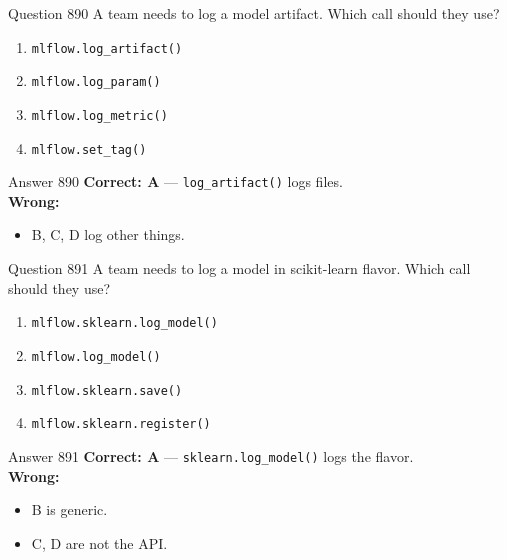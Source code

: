 \documentclass[aspectratio=169,11pt]{beamer}
\begin{document}
	\begin{frame}{Question 890}
		A team needs to log a model artifact. Which call should they use?
		\begin{enumerate}[label=\Alph*.]
			\item \texttt{mlflow.log\_artifact()}
			\item \texttt{mlflow.log\_param()}
			\item \texttt{mlflow.log\_metric()}
			\item \texttt{mlflow.set\_tag()}
		\end{enumerate}
	\end{frame}
	\begin{frame}{Answer 890}
		\textbf{Correct: A} --- \texttt{log\_artifact()} logs files.\\
		\vspace{0.5em}
		\textbf{Wrong:}
		\begin{itemize}
			\item B, C, D log other things.
		\end{itemize}
	\end{frame}
	
	\begin{frame}{Question 891}
		A team needs to log a model in scikit-learn flavor. Which call should they use?
		\begin{enumerate}[label=\Alph*.]
			\item \texttt{mlflow.sklearn.log\_model()}
			\item \texttt{mlflow.log\_model()}
			\item \texttt{mlflow.sklearn.save()}
			\item \texttt{mlflow.sklearn.register()}
		\end{enumerate}
	\end{frame}
	\begin{frame}{Answer 891}
		\textbf{Correct: A} --- \texttt{sklearn.log\_model()} logs the flavor.\\
		\vspace{0.5em}
		\textbf{Wrong:}
		\begin{itemize}
			\item B is generic.
			\item C, D are not the API.
		\end{itemize}
	\end{frame}
	
\end{document}
